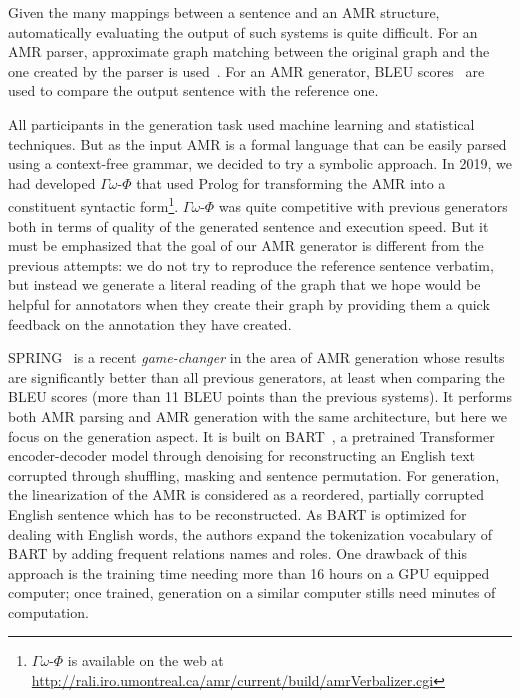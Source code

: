 \documentclass[12pt]{article}
\newcommand{\systeme}[1]{\textsc{#1}}
\newcommand{\gophi}{$\Gamma\omega$-$\Phi$}
\newcommand{\spring}{\systeme{SPRING}}
\newcommand{\representation}[1]{\textsf{#1}}
\newcommand{\AMR}{\representation{AMR}}
\begin{document}
Given the many mappings between a sentence and an \AMR{} structure, automatically evaluating the output of such systems is quite difficult.
For an \AMR{} parser, approximate graph matching between the original graph and the one created by the parser is used~\cite{P13-2131}. For an \AMR{} generator, BLEU scores~\cite{Papineni:2002:BMA:1073083.1073135} are used to compare the output sentence with the reference one. 

All participants in the generation task used machine learning and statistical techniques. But as the input \AMR{} is a formal language that can be easily parsed using a context-free grammar, we decided to try a symbolic approach.
In 2019, we had developed \gophi{} that used Prolog for transforming the AMR into a constituent syntactic form\footnote{\gophi{} is available on the web at \url{http://rali.iro.umontreal.ca/amr/current/build/amrVerbalizer.cgi}}.
\gophi{} was quite competitive with previous generators both in terms of quality of the generated sentence and execution speed. But it must be emphasized that the goal of our \AMR{} generator is different from the previous attempts: we do not try to reproduce the reference sentence verbatim, but instead we generate a literal reading of the graph that we hope would be helpful for annotators when they create their graph by providing them a quick feedback on the annotation they have created. 

\spring{}~\cite{bevilacqua-etal-2021-one} is a recent \emph{game-changer} in the area of AMR generation whose results are significantly better than all previous generators, at least when comparing the BLEU scores (more than 11 BLEU points than the previous systems). It performs both AMR parsing and AMR generation with the same architecture, but here we focus on the generation aspect. It is built on BART~\cite{lewis-etal-2020-bart}, a pretrained Transformer encoder-decoder model through denoising for reconstructing an English text corrupted through shuffling, masking and sentence permutation. For generation, the linearization of the AMR is considered as a reordered, partially corrupted English sentence which has to be reconstructed. As BART is optimized for dealing with English words, the authors expand the tokenization vocabulary of BART by adding frequent relations names and roles. One drawback of this approach is the training time needing more than 16 hours on a GPU equipped computer; once trained, generation on a similar computer stills need minutes of computation. 
\end{document}
